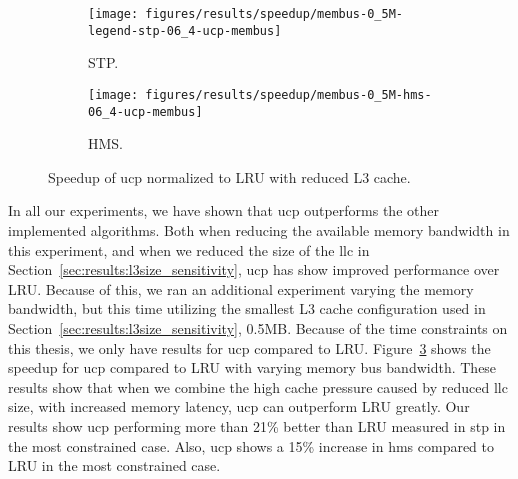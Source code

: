 \begin{figure}[t]
    \centering
        \begin{subfigure}[b]{0.5\textwidth}
            \texttt{[image: figures/results/speedup/membus-0\_5M-legend-stp-06\_4-ucp-membus]}
            \caption{STP.}
            \label{fig:results:bus-05:ucp:stp}
        \end{subfigure}%
        \begin{subfigure}[b]{0.5\textwidth}
            \texttt{[image: figures/results/speedup/membus-0\_5M-hms-06\_4-ucp-membus]}
            \caption{HMS.}
            \label{fig:results:bus-05:ucp:hms}
        \end{subfigure}
        \caption{Speedup of \gls{ucp} normalized to LRU with reduced L3 cache.}
        \label{fig:results:bus-05:ucp}
\end{figure}


In all our experiments, we have shown that \gls{ucp} outperforms the other implemented algorithms.
Both when reducing the available memory bandwidth in this experiment, and when we reduced the size of the \gls{llc} in Section~\ref{sec:results:l3size_sensitivity}, \gls{ucp} has show improved performance over LRU.
Because of this, we ran an additional experiment varying the memory bandwidth, but this time utilizing the smallest L3 cache configuration used in Section~\ref{sec:results:l3size_sensitivity}, 0.5MB.
Because of the time constraints on this thesis, we only have results for \gls{ucp} compared to LRU.
Figure~\ref{fig:results:bus-05:ucp} shows the speedup for \gls{ucp} compared to LRU with varying memory bus bandwidth.
These results show that when we combine the high cache pressure caused by reduced \gls{llc} size, with increased memory latency, \gls{ucp} can outperform LRU greatly.
Our results show \gls{ucp} performing more than 21\% better than LRU measured in \gls{stp} in the most constrained case.
Also, \gls{ucp} shows a 15\% increase in \gls{hms} compared to LRU in the most constrained case.
